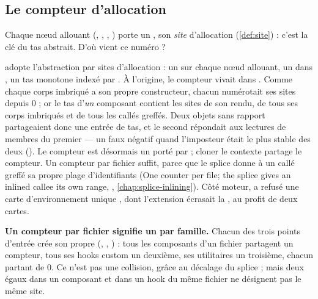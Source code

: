 \subsection{Le compteur d'allocation}

Chaque nœud allouant (, , , ) porte un , son \emph{site} d'allocation (\cref{def:site}) : c'est la clé du tas abstrait. D'où vient ce numéro ?


\begin{decision}
 adopte l'abstraction par sites d'allocation : un  sur chaque nœud allouant, un  dans , un tas monotone indexé par . À l'origine, le compteur vivait dans . Comme chaque corps imbriqué a son propre constructeur, chacun numérotait ses sites depuis 0 ; or le tas d'\emph{un} composant contient les sites de son rendu, de tous ses corps imbriqués et de tous les callés greffés. Deux objets sans rapport partageaient donc une entrée de tas, et le second répondait aux lectures de membres du premier --- un faux négatif quand l'imposteur était le plus stable des deux (). Le compteur est désormais un  porté par  ; cloner le contexte partage le compteur. Un compteur par fichier suffit, parce que le splice donne à un callé greffé sa propre plage d'identifiants (\og One counter per file; the splice gives an inlined callee its own range\fg{}, , \cref{chap:splice-inlining}). Côté moteur,  a refusé une carte d'environnement unique , dont l'extension écrasait la , au profit de deux cartes.
\end{decision}

\begin{piege}
\textbf{\og Un compteur par fichier\fg{} signifie un par famille.} Chacun des trois points d'entrée crée son propre  (, , ) : tous les composants d'un fichier partagent un compteur, tous ses hooks custom un deuxième, ses utilitaires un troisième, chacun partant de 0. Ce n'est pas une collision, grâce au décalage du splice ; mais deux  égaux dans un composant et dans un hook du même fichier ne désignent pas le même site.
\end{piege}

